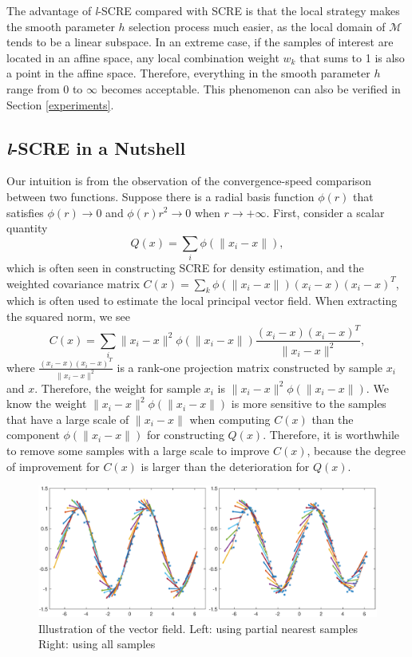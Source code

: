 \documentclass[aos,preprint]{imsart}
\theoremstyle{remark}
\begin{document}
The advantage of {\it l}-SCRE compared with SCRE is that the local strategy makes the smooth parameter $h$ selection process much easier, as the local domain of $\mathcal M$ tends to be a linear subspace. In an extreme case, if the samples of interest are located in an affine space, any local combination weight $w_k $ that sums to 1 is also a point in the affine space. Therefore, everything in the smooth parameter $h$ range from $0$ to $\infty$ becomes acceptable. This phenomenon can also be verified in Section \ref{experiments}.

\subsection{{\it l}-SCRE in a Nutshell}
Our intuition is from the observation of the convergence-speed comparison between two functions. Suppose there is a radial basis function $\phi(r)$ that satisfies $\phi(r)\rightarrow 0$ and $\phi(r)r^2\rightarrow 0$ when $ r \rightarrow +\infty$. First, consider a scalar quantity 
\[
 Q(x) = \sum_i \phi(\|x_i-x\|),
\]
which is often seen in constructing SCRE for density estimation, and the weighted covariance matrix $C(x) = \sum_k \phi(\|x_i-x\|)(x_i-x)(x_i-x)^T$, which is often used to estimate the local principal vector field. When extracting the squared norm, we see
\[
  C(x) = \sum_i \|x_i-x\|^2\phi(\|x_i-x\|)\frac{(x_i-x)(x_i-x)^T}{\|x_i-x\|^2} ,
\]
where $\frac{(x_i-x)(x_i-x)^T}{\|x_i-x\|^2}$ is a rank-one projection matrix constructed by sample $x_i$ and $x$. Therefore, the weight for sample $x_i$ is $\|x_i-x\|^2\phi(\|x_i-x\|)$.
We know the weight $\|x_i-x\|^2\phi(\|x_i-x\|)$ is more sensitive to the samples that have a large scale of $\|x_i-x\|$ when computing $C(x)$ than the component $\phi(\|x_i-x\|)$ for constructing $Q(x)$. Therefore, it is worthwhile to remove some samples with a large scale to improve $C(x)$, because the degree of improvement for $C(x)$ is larger than the deterioration for $Q(x)$. %

\begin{figure}[h] %
   \centering
   \includegraphics[width=\linewidth]{field_demo.eps} 
   \caption{Illustration of the vector field. Left: using partial nearest samples Right: using all samples}
   \label{fig:example:1}
\end{figure}
\end{document}
